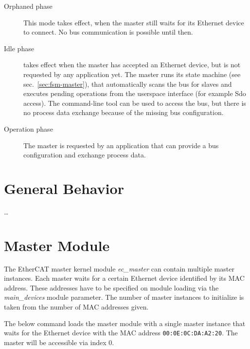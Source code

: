 \documentclass[a4paper,12pt,BCOR6mm,bibtotoc,idxtotoc]{scrbook}
\begin{document}
\begin{description}

\item[Orphaned phase] This mode takes effect, when the
master still waits for its Ethernet device to connect. No bus communication is
possible until then.

\item[Idle phase] takes effect when the master has accepted
an Ethernet device, but is not requested by any application yet. The master
runs its state machine (see sec.~\ref{sec:fsm-master}), that automatically
scans the bus for slaves and executes pending operations from the userspace
interface (for example Sdo access). The command-line tool can be used to
access the bus, but there is no process data exchange because of the missing
bus configuration.

\item[Operation phase] The master is requested by an
application that can provide a bus configuration and exchange process data.

\end{description}


\section{General Behavior} %

\ldots



\section{Master Module}
\label{sec:mastermod}

The EtherCAT master kernel module \textit{ec\_master} can contain multiple
master instances. Each master waits for a certain Ethernet device identified
by its MAC address. These addresses have to be specified on
module loading via the \textit{main\_devices} module parameter. The number of
master instances to initialize is taken from the number of MAC addresses
given.

The below command loads the master module with a single master instance that
waits for the Ethernet device with the MAC address
\lstinline+00:0E:0C:DA:A2:20+. The master will be accessible via index $0$.
\end{document}
